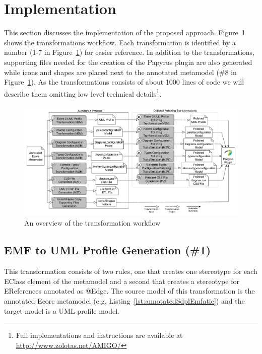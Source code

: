 \section{Implementation}
\label{sec:implementation}
This section discusses the implementation of the proposed approach. Figure~\ref{fig:transformationWorkflow} shows the transformations workflow. Each transformation is identified by a number (1-7 in Figure~\ref{fig:transformationWorkflow}) for easier reference. In addition to the transformations, supporting files needed for the creation of the Papyrus plugin are also generated while icons and shapes are placed next to the annotated metamodel (\#8 in Figure~\ref{fig:transformationWorkflow}). As the transformations consists of about 1000 lines of code we will describe them omitting low level technical details\footnote{Full implementations and instructions are available at \url{http://www.zolotas.net/AMIGO/}}. 

\begin{figure}[t]
	\centering
	\includegraphics[width=1	\textwidth]{diagrams/transformationWorkflow.pdf}
	\caption[]{An overview of the transformation workflow}
	\label{fig:transformationWorkflow}
	
	\vspace*{-3mm}
\end{figure}

\subsection{EMF to UML Profile Generation (\#1)}
\label{sec:profileGeneration}
This transformation consists of two rules, one that creates one stereotype for each EClass element of the metamodel and a second that creates a stereotype for EReferences annotated as @Edge. The source model of this transformation is the annotated Ecore metamodel (e.g,  Listing~\ref{lst:annotatedSdplEmfatic}) and the target model is a UML profile model.

